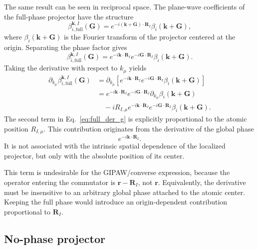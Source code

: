 \documentclass[11pt]{article}
\begin{document}
The same result can be seen in reciprocal space. The plane-wave
coefficients of the full-phase projector have the structure
\begin{equation}
\beta_{i,\mathrm{full}}^{\mathbf k,I}(\mathbf G)
=
e^{-i(\mathbf k+\mathbf G)\cdot\mathbf R_I}
\beta_i(\mathbf k+\mathbf G),
\label{eq:beta_full_g}
\end{equation}
where $\beta_i(\mathbf k+\mathbf G)$ is the Fourier transform of the
projector centered at the origin. Separating the phase factor gives
\begin{equation}
\beta_{i,\mathrm{full}}^{\mathbf k,I}(\mathbf G)
=
e^{-i\mathbf k\cdot\mathbf R_I}
e^{-i\mathbf G\cdot\mathbf R_I}
\beta_i(\mathbf k+\mathbf G).
\label{eq:beta_full_g_sep}
\end{equation}
Taking the derivative with respect to $k_\mu$ yields
\begin{align}
\partial_{k_\mu}
\beta_{i,\mathrm{full}}^{\mathbf k,I}(\mathbf G)
&=
\partial_{k_\mu}
\left[
e^{-i\mathbf k\cdot\mathbf R_I}
e^{-i\mathbf G\cdot\mathbf R_I}
\beta_i(\mathbf k+\mathbf G)
\right]
\nonumber\\
&=
e^{-i\mathbf k\cdot\mathbf R_I}
e^{-i\mathbf G\cdot\mathbf R_I}
\partial_{k_\mu}\beta_i(\mathbf k+\mathbf G)
\nonumber\\
&\quad
-iR_{I,\mu}
e^{-i\mathbf k\cdot\mathbf R_I}
e^{-i\mathbf G\cdot\mathbf R_I}
\beta_i(\mathbf k+\mathbf G).
\label{eq:full_der_g}
\end{align}
The second term in Eq.~\eqref{eq:full_der_g} is explicitly proportional
to the atomic position $R_{I,\mu}$. This contribution originates from
the derivative of the global phase
\begin{equation}
e^{-i\mathbf k\cdot\mathbf R_I}.
\end{equation}
It is not associated with the intrinsic spatial dependence of the
localized projector, but only with the absolute position of its center.

This term is undesirable for the GIPAW/converse expression, because the
operator entering the commutator is $\mathbf r-\mathbf R_I$, not
$\mathbf r$. Equivalently, the derivative must be insensitive to an
arbitrary global phase attached to the atomic center. Keeping the
full phase would introduce an origin-dependent contribution proportional
to $\mathbf R_I$.

\subsection{No-phase projector}
\end{document}
